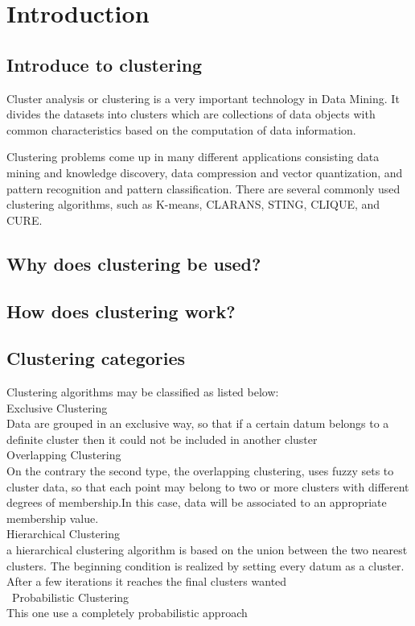 \section{Introduction}
\subsection{Introduce to clustering}

\forceindent Cluster analysis or clustering is a very important technology in Data Mining. It divides the datasets into clusters which are collections of data objects with common characteristics based on the computation of data information.

Clustering problems come up in many different applications consisting data mining and knowledge discovery, data compression and vector quantization, and pattern recognition and pattern classification. There are several commonly used clustering algorithms, such as K-means, CLARANS, STING, CLIQUE, and CURE.  %


\subsection{Why does clustering be used?}

\subsection{How does clustering work?}

\subsection{Clustering categories}
Clustering algorithms may be classified as listed below:\\
Exclusive Clustering \\
Data are grouped in an exclusive way, so that if a certain datum belongs to a definite cluster then it could not be included in another cluster\\
Overlapping Clustering \\
On the contrary the second type, the overlapping clustering, uses fuzzy sets to cluster data, so that each point may belong to two or more clusters with different degrees of membership.In this case, data will be associated to an appropriate membership value.\\
Hierarchical Clustering \\
a hierarchical clustering algorithm is based on the union between the two nearest clusters. The beginning condition is realized by setting every datum as a cluster. After a few iterations it reaches the final clusters wanted\\\
Probabilistic Clustering\\
This one use a completely probabilistic approach

